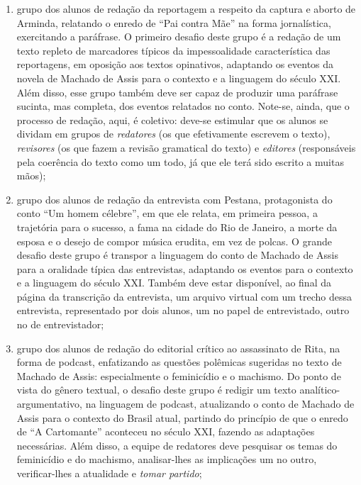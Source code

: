\documentclass[11pt]{extarticle}
\begin{document}
\begin{enumerate}
\item grupo dos alunos de redação da reportagem a respeito da captura e
aborto de Arminda, relatando o enredo de ``Pai contra Mãe'' na forma
jornalística, exercitando a paráfrase. O primeiro desafio deste grupo é
a redação de um texto repleto de marcadores típicos da impessoalidade
característica das reportagens, em oposição aos textos opinativos,
adaptando os eventos da novela de Machado de Assis para o contexto e a
linguagem do século XXI. Além disso, esse grupo também deve ser capaz de
produzir uma paráfrase sucinta, mas completa, dos eventos relatados no
conto. Note-se, ainda, que o processo de redação, aqui, é coletivo:
deve-se estimular que os alunos se dividam em grupos de \emph{redatores}
(os que efetivamente escrevem o texto), \emph{revisores} (os que fazem a
revisão gramatical do texto) e \emph{editores} (responsáveis pela
coerência do texto como um todo, já que ele terá sido escrito a muitas
mãos);


\item grupo dos alunos de redação da entrevista com Pestana, protagonista
do conto ``Um homem célebre'', em que ele relata, em primeira pessoa, a
trajetória para o sucesso, a fama na cidade do Rio de Janeiro, a morte
da esposa e o desejo de compor música erudita, em vez de polcas. O
grande desafio deste grupo é transpor a linguagem do conto de Machado de
Assis para a oralidade típica das entrevistas, adaptando os eventos para
o contexto e a linguagem do século XXI. Também deve estar disponível, ao
final da página da transcrição da entrevista, um arquivo virtual com um
trecho dessa entrevista, representado por dois alunos, um no papel de
entrevistado, outro no de entrevistador;

\item grupo dos alunos de redação do editorial crítico ao assassinato de
Rita, na forma de podcast, enfatizando as questões polêmicas sugeridas
no texto de Machado de Assis: especialmente o feminicídio e o machismo.
Do ponto de vista do gênero textual, o desafio deste grupo é redigir um
texto analítico-argumentativo, na linguagem de podcast, atualizando o
conto de Machado de Assis para o contexto do Brasil atual, partindo do
princípio de que o enredo de ``A Cartomante'' aconteceu no século XXI,
fazendo as adaptações necessárias. Além disso, a equipe de redatores
deve pesquisar os temas do feminicídio e do machismo, analisar-lhes as
implicações um no outro, verificar-lhes a atualidade e \emph{tomar
partido};


\end{enumerate}
\end{document}
